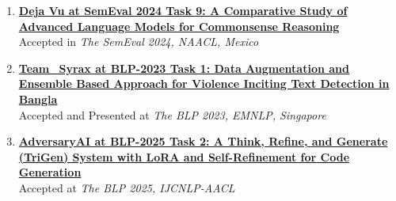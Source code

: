 
\vspace{0.3em}

\begin{enumerate}[label={}]
    \item \textbf{\href{https://aclanthology.org/2024.semeval-1.180.pdf}{Deja Vu at SemEval 2024 Task 9: A Comparative Study of Advanced Language Models for Commonsense Reasoning}} \\
    Accepted in \textit{The SemEval 2024, NAACL, Mexico} 

    \vspace{0.3em}
    
    \item \textbf{\href{https://aclanthology.org/2023.banglalp-1.32.pdf}{Team\_Syrax at BLP-2023 Task 1: Data Augmentation and Ensemble Based Approach for Violence Inciting Text Detection in Bangla}} \\
    Accepted and Presented at \textit{The BLP 2023, EMNLP, Singapore}  \\
    
    \vspace{-0.6em}
    
    \item \textbf{\href{https://aclanthology.org/2023.banglalp-1.32.pdf}{AdversaryAI at BLP-2025 Task 2: A Think, Refine, and Generate (TriGen) System with LoRA and Self-Refinement for Code Generation}} \\
    Accepted at \textit{The BLP 2025, IJCNLP-AACL}  \\

    \vspace{-.5em}
\end{enumerate}
